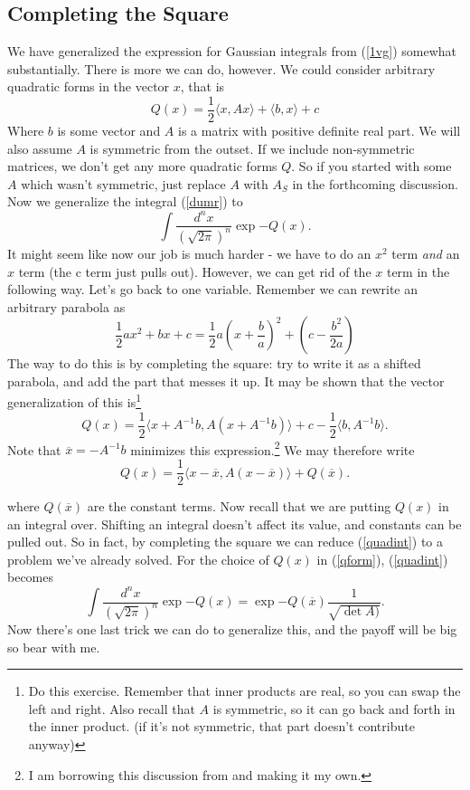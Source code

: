 \documentclass{book}
\begin{document}
\subsection{Completing the Square}
We have generalized the expression for Gaussian integrals from (\ref{1vg}) somewhat substantially. There is more we can do, however. We could consider arbitrary quadratic forms in the vector $x$, that is
\begin{equation} \label{qform}
Q(x) = \frac{1}{2} \langle x, A x \rangle + \langle b, x \rangle + c
\end{equation}
Where $b$ is some vector and $A$ is a matrix with positive definite real part. We will also assume $A$ is symmetric from the outset. If we include non-symmetric matrices, we don't get any more quadratic forms $Q$. So if you started with some $A$ which wasn't symmetric, just replace $A$ with $A_S$ in the forthcoming discussion. Now we generalize the integral (\ref{dumr}) to
\begin{equation} \label{quadint}
\int \frac{d^n x}{(\sqrt{2\pi})^n} \exp{-Q(x)}.
\end{equation}
It might seem like now our job is much harder - we have to do an $x^2$ term \textit{and} an $x$ term (the c term just pulls out). However, we can get rid of the $x$ term in the following way. Let's go back to one variable. Remember we can rewrite an arbitrary parabola as
\begin{equation} \label{grade8}
\frac{1}{2} a x^2 + bx + c = \frac{1}{2} a\left( x + \frac{b}{a} \right)^2 + \left( c - \frac{b^2}{2a} \right)
\end{equation}
The way to do this is by completing the square: try to write it as a shifted parabola, and add the part that messes it up. It may be shown that the vector generalization of this is\footnote{Do this exercise. Remember that inner products are real, so you can swap the left and right. Also recall that $A$ is symmetric, so it can go back and forth in the inner product. (if it's not symmetric, that part doesn't contribute anyway)}
\[
Q(x) = \frac{1}{2} \langle x + A^{-1}b, A \left( x + A^{-1}b\right) \rangle + c - \frac{1}{2}\langle b, A^{-1} b \rangle.
\]
Note that $\overline{x} = -A^{-1} b$ minimizes this expression.\footnote{I am borrowing this discussion from \cite{Co1} and making it my own.} We may therefore write
\[
Q(x) = \frac{1}{2} \langle x - \overline{x}, A(x - \overline{x}) \rangle + Q(\overline{x}).
\]

where $Q(\overline{x})$ are the constant terms. Now recall that we are putting $Q(x)$ in an integral over. Shifting an integral doesn't affect its value, and constants can be pulled out. So in fact, by completing the square we can reduce (\ref{quadint}) to a problem we've already solved. For the choice of $Q(x)$ in (\ref{qform}), (\ref{quadint}) becomes
\begin{equation} \label{cts}
\int \frac{d^n x}{(\sqrt{2\pi})^n} \exp{-Q(x)} = \exp{-Q(\overline{x})} \frac{1}{\sqrt{\det A)}}.
\end{equation}
Now there's one last trick we can do to generalize this, and the payoff will be big so bear with me. 
\end{document}
